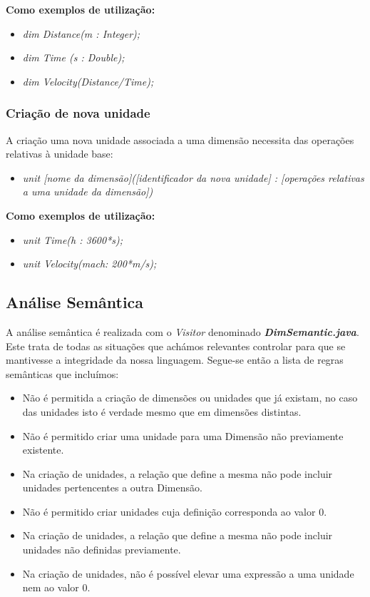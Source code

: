 \documentclass[10pt,portuguese]{article}
\begin{document}
\textbf{Como exemplos de utilização:}

\begin{itemize}
    \item \textit{dim Distance(m : Integer);}
    \item \textit{dim Time (s : Double);}
    \item \textit{dim Velocity(Distance/Time);}
\end{itemize}

\subsubsection{Criação de nova unidade}

\par A criação uma nova unidade associada a uma dimensão necessita das operações relativas à unidade base:

\begin{itemize}
    \item \textit{unit [nome da dimensão]([identificador da nova unidade] : [operações relativas a uma unidade da dimensão])}
\end{itemize}

\textbf{Como exemplos de utilização:}

\begin{itemize}
    \item \textit{unit Time(h : 3600*s);}
    \item \textit{unit Velocity(mach: 200*m/s);}
\end{itemize}

\subsection{Análise Semântica}

\par A análise semântica é realizada com o \emph{Visitor} denominado \textbf{\emph{DimSemantic.java}}. Este trata de todas as situações que achámos relevantes controlar para que se mantivesse a integridade da nossa linguagem. Segue-se então a lista de regras semânticas que incluímos:
\begin{itemize}
    \item Não é permitida a criação de dimensões ou unidades que já existam, no caso das unidades isto é verdade mesmo que em dimensões distintas.
    \item Não é permitido criar uma unidade para uma Dimensão não previamente existente.
    \item Na criação de unidades, a relação que define a mesma não pode incluir unidades pertencentes a outra Dimensão.
    \item Não é permitido criar unidades cuja definição corresponda ao valor 0. 
    \item Na criação de unidades, a relação que define a mesma não pode incluir unidades não definidas previamente.
    \item Na criação de unidades, não é possível elevar uma expressão a uma unidade nem ao valor 0.
\end{itemize}
\end{document}
